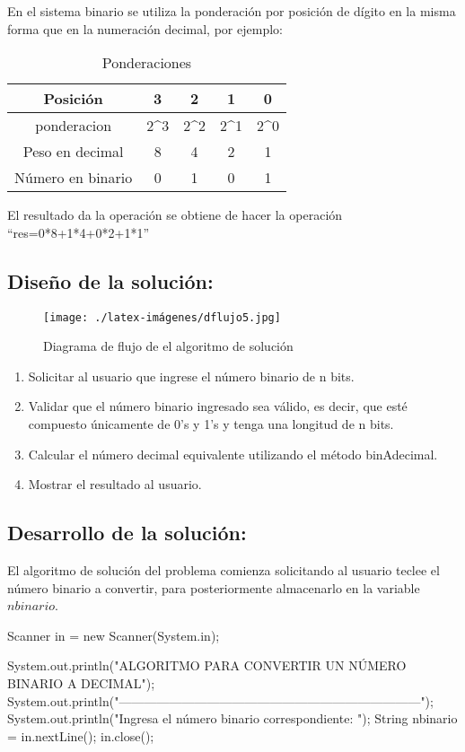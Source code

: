 En el sistema binario se utiliza la ponderación por posición de dígito en la misma forma que en la numeración decimal, por ejemplo:

\begin{table}[h!]
     \centering
     \caption{Ponderaciones}
     
     \begin{tabular}{|c|c|c|c|c|}
     \hline
        Posición & 3 & 2 & 1 & 0 \\
        \hline
        ponderacion  & 2^{3} & 2^{2} & 2^{1} & 2^{0} \\
        \hline
        Peso en decimal  & 8 & 4 & 2 & 1 \\
        \hline
        Número en binario  & 0 & 1 & 0 & 1 \\
        \hline
     \end{tabular}
     \label{tab:my_label}
 \end{table}

El resultado da la operación se obtiene de hacer la operación “res=0*8+1*4+0*2+1*1”

\subsection{\textbf{Diseño de la solución:}}

\begin{figure}[h!]
    \centering
    \texttt{[image: ./latex-imágenes/dflujo5.jpg]}
    \caption{Diagrama de flujo de el algoritmo de solución}
    \label{}
\end{figure}

\begin{enumerate}
    \item Solicitar al usuario que ingrese el número binario de n bits.
    \item Validar que el número binario ingresado sea válido, es decir, que esté compuesto únicamente de 0's y 1's y tenga una longitud de n bits.
    \item Calcular el número decimal equivalente utilizando el método binAdecimal.
    \item Mostrar el resultado al usuario.
\end{enumerate}

\subsection{\textbf{Desarrollo de la solución:}}

El algoritmo de solución del problema comienza solicitando al usuario teclee el número binario a convertir, para posteriormente almacenarlo en la variable $nbinario$.
\begin{javaCode}

Scanner in = new Scanner(System.in);
        
    System.out.println("ALGORITMO PARA CONVERTIR UN NÚMERO BINARIO A DECIMAL");
    System.out.println("------------------------------------------------------------------------");
    System.out.println("Ingresa el número binario correspondiente: ");
    String nbinario = in.nextLine();
    in.close();
        
\end{javaCode}


